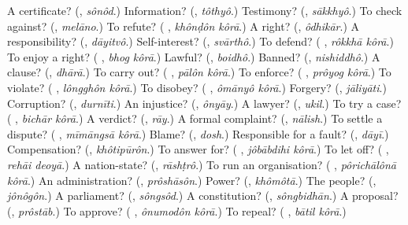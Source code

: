 \begin{tcolorbox}[breakable,colback=teal!4,colframe=teal!35!black,title={Before you move on}]
A certificate? (\textbf{}, \emph{sônôd}.) Information? (\textbf{}, \emph{tôthyô}.) Testimony? (\textbf{}, \emph{sākkhyô}.) To check against? (\textbf{}, \emph{melāno}.) To refute? (\textbf{ }, \emph{khônḍôn kôrā}.) A right? (\textbf{}, \emph{ôdhikār}.) A responsibility? (\textbf{}, \emph{dāyitvô}.) Self-interest? (\textbf{}, \emph{svārthô}.) To defend? (\textbf{ }, \emph{rôkkhā kôrā}.) To enjoy a right? (\textbf{ }, \emph{bhog kôrā}.) Lawful? (\textbf{}, \emph{boidhô}.) Banned? (\textbf{}, \emph{nishiddhô}.) A clause? (\textbf{}, \emph{dhārā}.) To carry out? (\textbf{ }, \emph{pālôn kôrā}.) To enforce? (\textbf{ }, \emph{prôyog kôrā}.) To violate? (\textbf{ }, \emph{lôngghôn kôrā}.) To disobey? (\textbf{ }, \emph{ômānyô kôrā}.) Forgery? (\textbf{}, \emph{jāliyāti}.) Corruption? (\textbf{}, \emph{durnīti}.) An injustice? (\textbf{}, \emph{ônyāy}.) A lawyer? (\textbf{}, \emph{ukil}.) To try a case? (\textbf{ }, \emph{bichār kôrā}.) A verdict? (\textbf{}, \emph{rāy}.) A formal complaint? (\textbf{}, \emph{nālish}.) To settle a dispute? (\textbf{ }, \emph{mīmāngsā kôrā}.) Blame? (\textbf{}, \emph{dosh}.) Responsible for a fault? (\textbf{}, \emph{dāyī}.) Compensation? (\textbf{}, \emph{khôtipūrôn}.) To answer for? (\textbf{ }, \emph{jôbābdihi kôrā}.) To let off? (\textbf{ }, \emph{rehāi deoyā}.) A nation-state? (\textbf{}, \emph{rāshṭrô}.) To run an organisation? (\textbf{ }, \emph{pôrichālônā kôrā}.) An administration? (\textbf{}, \emph{prôshāsôn}.) Power? (\textbf{}, \emph{khômôtā}.) The people? (\textbf{}, \emph{jônôgôn}.) A parliament? (\textbf{}, \emph{sôngsôd}.) A constitution? (\textbf{}, \emph{sôngbidhān}.) A proposal? (\textbf{}, \emph{prôstāb}.) To approve? (\textbf{ }, \emph{ônumodôn kôrā}.) To repeal? (\textbf{ }, \emph{bātil kôrā}.)
\end{tcolorbox}
